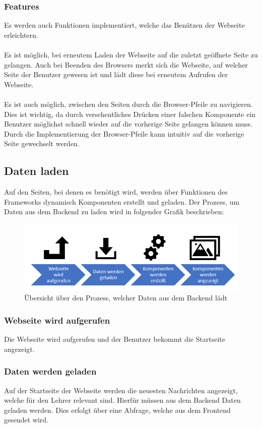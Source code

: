 \subsubsection{Features}
Es werden auch Funktionen implementiert, welche das Benützen der Webseite erleichtern.
\\\\
Es ist möglich, bei erneutem Laden der Webseite auf die zuletzt geöffnete Seite zu gelangen. Auch bei Beenden des Browsers merkt sich die Webseite, auf welcher Seite der Benutzer gewesen ist und lädt diese bei erneutem Aufrufen der Webseite.
\\\\
Es ist auch möglich, zwischen den Seiten durch die Browser-Pfeile zu navigieren. Dies ist wichtig, da durch versehentliches Drücken einer falschen Komponente ein Benutzer möglichst schnell wieder auf die vorherige Seite gelangen können muss. Durch die Implementierung der Browser-Pfeile kann intuitiv auf die vorherige Seite gewechselt werden.
\newpage
\subsection{Daten laden}
Auf den Seiten, bei denen es benötigt wird, werden über Funktionen des Frameworks dynamisch Komponenten erstellt und geladen. Der Prozess, um Daten aus dem Backend zu laden wird in folgender Grafik beschrieben:
\begin{figure}[H]
	\centering
	\includegraphics[width=0.8\linewidth]{images/Prozess_Daten_laden}
	\caption[Prozess der Daten zur Anzeige]{Übersicht über den Prozess, welcher Daten aus dem Backend lädt}
	\label{fig:prozessdatenladen}
\end{figure}

\subsubsection{Webseite wird aufgerufen}
Die Webseite wird aufgerufen und der Benutzer bekommt die Startseite angezeigt.

\subsubsection{Daten werden geladen}
Auf der Startseite der Webseite werden die neuesten Nachrichten angezeigt, welche für den Lehrer relevant sind. Hierfür müssen aus dem Backend Daten geladen werden. Dies erfolgt über eine Abfrage, welche aus dem Frontend gesendet wird.

